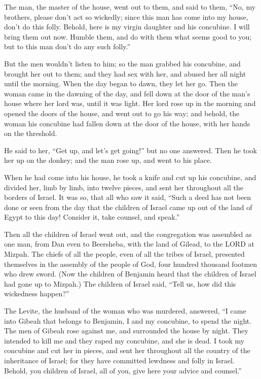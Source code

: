 \myverse{}The man, the master of the house, went out to them, and said
to them, “No, my brothers, please don’t act so wickedly; since this man has come into my house, don’t
do this folly.
\myverse{}Behold, here is my virgin daughter and his concubine. I will bring them out
now. Humble them, and do with them what seems good to you; but to this man don’t do any such folly.”

\myverse{}But the men wouldn’t listen to him; so the man grabbed his concubine,
and brought her out to them; and they had sex with her, and abused her all night until the morning. When
the day began to dawn, they let her go.
\myverse{}Then the woman came in the dawning of the day, and fell down at the door
of the man’s house where her lord was, until it was light.
\myverse{}Her lord rose up in the morning and opened the doors of the house, and went
out to go his way; and behold, the woman his concubine had fallen down at the door of the house, with
her hands on the threshold.

\myverse{}He said to her, “Get up, and let’s get going!” but no one answered.
Then he took her up on the donkey; and the man rose up, and went to his place.

\myverse{}When he had come into his house, he took a knife and cut up
his concubine, and divided her, limb by limb, into twelve pieces, and sent her throughout all the borders
of Israel.
\myverse{}It was so, that all who saw it said, “Such a deed has not been done or seen
from the day that the children of Israel came up out of the land of Egypt to this day! Consider it, take
counsel, and speak.”


\mychapter{} \myverse*{}Then all the children of Israel went out, and the congregation
was assembled as one man, from Dan even to Beersheba, with the land of Gilead, to the LORD at Mizpah.
\myverse{}The chiefs of all the people, even of all the tribes of Israel, presented themselves
in the assembly of the people of God, four hundred thousand footmen who drew sword.
\myverse{}(Now the children of Benjamin heard that the children of Israel had gone up
to Mizpah.) The children of Israel said, “Tell us, how did this wickedness happen?”

\myverse{}The Levite, the husband of the woman who was murdered, answered,
“I came into Gibeah that belongs to Benjamin, I and my concubine, to spend the night.
\myverse{}The men of Gibeah rose against me, and surrounded the house by night. They
intended to kill me and they raped my concubine, and she is dead.
\myverse{}I took my concubine and cut her in pieces, and sent her throughout all the
country of the inheritance of Israel; for they have committed lewdness and folly in Israel.
\myverse{}Behold, you children of Israel, all of you, give here your advice and counsel.”

